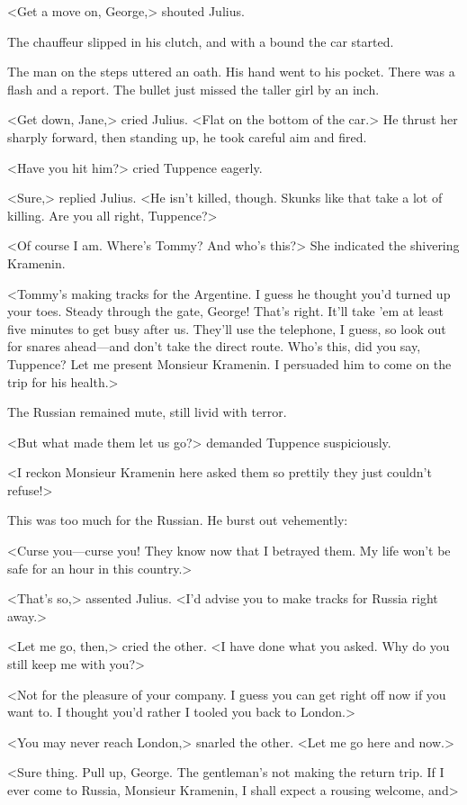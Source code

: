 <Get a move on, George,> shouted Julius.

The chauffeur slipped in his clutch, and with a bound the car started.

The man on the steps uttered an oath. His hand went to his pocket. There was a flash and a report. The bullet just missed the taller girl by an inch.

<Get down, Jane,> cried Julius. <Flat on the bottom of the car.> He thrust her sharply forward, then standing up, he took careful aim and fired.

<Have you hit him?> cried Tuppence eagerly.

<Sure,> replied Julius. <He isn't killed, though. Skunks like that take a lot of killing. Are you all right, Tuppence?>

<Of course I am. Where's Tommy? And who's this?> She indicated the shivering Kramenin.

<Tommy's making tracks for the Argentine. I guess he thought you'd turned up your toes. Steady through the gate, George! That's right. It'll take 'em at least five minutes to get busy after us. They'll use the telephone, I guess, so look out for snares ahead—and don't take the direct route. Who's this, did you say, Tuppence? Let me present Monsieur Kramenin. I persuaded him to come on the trip for his health.>

The Russian remained mute, still livid with terror.

<But what made them let us go?> demanded Tuppence suspiciously.

<I reckon Monsieur Kramenin here asked them so prettily they just couldn't refuse!>

This was too much for the Russian. He burst out vehemently:

<Curse you—curse you! They know now that I betrayed them. My life won't be safe for an hour in this country.>

<That's so,> assented Julius. <I'd advise you to make tracks for Russia right away.>

<Let me go, then,> cried the other. <I have done what you asked. Why do you still keep me with you?>

<Not for the pleasure of your company. I guess you can get right off now if you want to. I thought you'd rather I tooled you back to London.>

<You may never reach London,> snarled the other. <Let me go here and now.>

<Sure thing. Pull up, George. The gentleman's not making the return trip. If I ever come to Russia, Monsieur Kramenin, I shall expect a rousing welcome, and\longdash>

